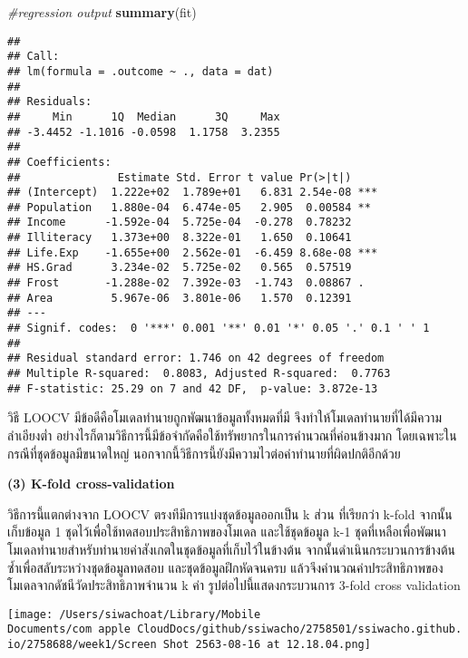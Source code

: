 \documentclass[
]{article}
\newenvironment{Shaded}{\begin{snugshade}}{\end{snugshade}}
\newcommand{\CommentTok}[1]{\textcolor[rgb]{0.56,0.35,0.01}{\textit{#1}}}
\newcommand{\KeywordTok}[1]{\textcolor[rgb]{0.13,0.29,0.53}{\textbf{#1}}}
\newcommand{\NormalTok}[1]{#1}
\begin{document}
\begin{Shaded}
\begin{Highlighting}[]
\CommentTok{\#regression output}
\KeywordTok{summary}\NormalTok{(fit)}
\end{Highlighting}
\end{Shaded}

\begin{verbatim}
## 
## Call:
## lm(formula = .outcome ~ ., data = dat)
## 
## Residuals:
##     Min      1Q  Median      3Q     Max 
## -3.4452 -1.1016 -0.0598  1.1758  3.2355 
## 
## Coefficients:
##               Estimate Std. Error t value Pr(>|t|)    
## (Intercept)  1.222e+02  1.789e+01   6.831 2.54e-08 ***
## Population   1.880e-04  6.474e-05   2.905  0.00584 ** 
## Income      -1.592e-04  5.725e-04  -0.278  0.78232    
## Illiteracy   1.373e+00  8.322e-01   1.650  0.10641    
## Life.Exp    -1.655e+00  2.562e-01  -6.459 8.68e-08 ***
## HS.Grad      3.234e-02  5.725e-02   0.565  0.57519    
## Frost       -1.288e-02  7.392e-03  -1.743  0.08867 .  
## Area         5.967e-06  3.801e-06   1.570  0.12391    
## ---
## Signif. codes:  0 '***' 0.001 '**' 0.01 '*' 0.05 '.' 0.1 ' ' 1
## 
## Residual standard error: 1.746 on 42 degrees of freedom
## Multiple R-squared:  0.8083, Adjusted R-squared:  0.7763 
## F-statistic: 25.29 on 7 and 42 DF,  p-value: 3.872e-13
\end{verbatim}

วิธี LOOCV มีข้อดีคือโมเดลทำนายถูกพัฒนาข้อมูลทั้งหมดที่มี
จึงทำให้โมเดลทำนายที่ได้มีความลำเอียงต่ำ
อย่างไรก็ตามวิธีการนี้มีข้อจำกัดคือใช้ทรัพยากรในการคำนวณที่ค่อนข้างมาก
โดยเฉพาะในกรณีที่ชุดข้อมูลมีขนาดใหญ่
นอกจากนี้วิธีการนี้ยังมีความไวต่อค่าทำนายที่ผิดปกติอีกด้วย

\textbf{(3) K-fold cross-validation}

วิธีการนี้แตกต่างจาก LOOCV ตรงทีมีการแบ่งชุดข้อมูลออกเป็น k ส่วน
ที่เรียกว่า k-fold จากนั้นเก็บข้อมูล 1
ชุดไว้เพื่อใช้ทดสอบประสิทธิภาพของโมเดล และใช้ชุดข้อมูล k-1
ชุดที่เหลือเพื่อพัฒนาโมเดลทำนายสำหรับทำนายค่าสังเกตในชุดข้อมูลที่เก็บไว้ในข้างต้น
จากนั้นดำเนินกระบวนการข้างต้นซ้ำเพื่อสลับระหว่างชุดข้อมูลทดสอบ
และชุดข้อมูลฝึกหัดจนครบ
แล้วจึงคำนวณค่าประสิทธิภาพของโมเดลจากดัชนีวัดประสิทธิภาพจำนวน k ค่า
รูปต่อไปนี้แสดงกระบวนการ 3-fold cross validation

\texttt{[image: /Users/siwachoat/Library/Mobile Documents/com~apple~CloudDocs/github/ssiwacho/2758501/ssiwacho.github.io/2758688/week1/Screen Shot 2563-08-16 at 12.18.04.png]}
\end{document}
